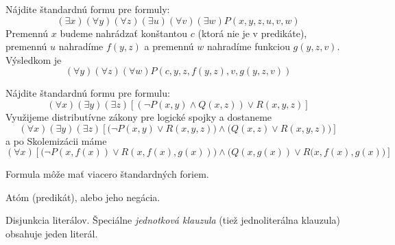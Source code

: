 \begin{priklad}
    Nájdite štandardnú formu pre formuly:
    \begin{equation*}
        (\exists x) (\forall y) (\forall z) (\exists u) (\forall v) (\exists w)
        P(x,y,z,u,v,w)
    \end{equation*}
    Premennú $x$ budeme nahrádzať konštantou $c$ (ktorá nie je v predikáte),
    premennú $u$ nahradíme $f(y,z)$ a
    premennú $w$ nahradíme funkciou $g(y,z,v)$. Výsledkom je
    \begin{equation*}
        (\forall y)(\forall z)(\forall w) P(c,y,z,f(y,z),v,g(y,z,v))
    \end{equation*}
\end{priklad}

\begin{priklad}
    Nájdite štandardnú formu pre formulu:
    \begin{equation*}
        (\forall x)(\exists y) (\exists z) 
        \left[ (\neg P(x,y) \land Q(x,z))\lor R(x,y,z)\right]
    \end{equation*}
    Využijeme distributívne zákony pre logické spojky a dostaneme
    \begin{equation*}
        (\forall x) (\exists y) (\exists z)
        \left[ \Big(\neg P(x,y) \lor R(x,y,z)\Big) \land
            \Big(Q(x,z)\lor R(x,y,z)\Big)\right]
    \end{equation*}
    a po Skolemizácii máme
    \begin{equation*}
        (\forall x) \left[
            \Big(\neg P(x,f(x)) \lor R(x,f(x),g(x)) \Big) \land
            \Big( Q(x,g(x))\lor R(x,f(x),g(x) \Big) \right]
    \end{equation*}
\end{priklad}

\begin{poznamka}
    Formula môže mať viacero štandardných foriem.
\end{poznamka}




\begin{definicia}[Literál]
    Atóm (predikát), alebo jeho negácia.
\end{definicia}

\begin{definicia}[Klauzula]
    Disjunkcia literálov.
    Špeciálne \emph{jednotková klauzula} (tiež jednoliterálna klauzula)
    obsahuje jeden literál. 
\end{definicia}

